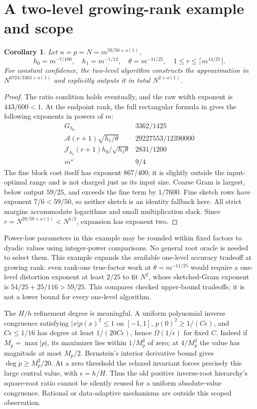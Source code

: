 \documentclass[11pt]{article}
\newtheorem{corollary}[theorem]{Corollary}
\newcommand{\Ac}{\mathcal A}
\newcommand{\Jc}{\mathcal J}
\begin{document}
\section{A two-level growing-rank example and scope}
\begin{corollary}\label{cor:twolevel}
Let \(n=p=N=m^{59/50+o(1)}\),
\[
 h_0=m^{-7/100},\quad h_1=m^{-1/12},\quad
 \theta=m^{-11/25},\quad1\leq r\leq\lceil m^{14/25}\rceil.
\]
For constant confidence, the two-level algorithm constructs the
approximation in \(N^{6724/3363+o(1)}\) and explicitly outputs it in
total \(N^{2+o(1)}\).
\end{corollary}
\begin{proof}
The ratio condition holds eventually, and the raw width exponent is
\(443/600<1\). At the endpoint rank, the full rectangular formula in
\cite{amanov} gives the following exponents in powers of \(m\):
\[
\begin{array}{c|c}
 G_{h_0}&3362/1425\\
 \Ac(r+1)\sqrt{h_1/\theta}&29227553/12390000\\
 \Jc_{h_1}(r+1)h_0/\sqrt{h_1\theta}&2831/1200\\
 m^\omega&9/4
\end{array}
\]
The fine block cost itself has exponent \(867/400\); it is slightly
outside the input-optimal range and is not charged just as its input
size. Coarse Gram is largest, below output \(59/25\), and exceeds
the fine term by \(1/7600\). Fine sketch rows have exponent
\(7/6<59/50\), so neither sketch is an identity fallback here.
All strict margins accommodate logarithms and small multiplication slack.
Since \(r=N^{28/59+o(1)}<N^{1/2}\), expansion has exponent two.
\end{proof}

Power-law parameters in this example may be rounded within fixed factors
to dyadic values using integer-power comparisons. No general root oracle
is needed to select them. This example expands the available one-level
accuracy tradeoff at growing rank: even rank-one true-factor work at
\(\theta=m^{-11/25}\) would require a one-level distortion exponent
at least \(2/25\) to fit \(N^2\), whose sketched-Gram exponent is
\(54/25+25/116>59/25\). This compares checked upper-bound tradeoffs;
it is not a lower bound for every one-level algorithm.

The \(H/h\) refinement degree is meaningful. A uniform polynomial
inverse congruence satisfying \(|x|p(x)^2\leq1\) on \([-1,1]\),
\(p(0)^2\geq1/(C\epsilon)\), and \(C\epsilon\leq1/16\) has degree
at least \(1/(20C\epsilon)\), hence \(\Omega(1/\epsilon)\) for fixed \(C\).
Indeed if \(M_p=\max|p|\), its maximizer lies within \(1/M_p^2\)
of zero; at \(4/M_p^2\) the value has magnitude at most \(M_p/2\).
Bernstein's interior derivative bound gives
\(\deg p\geq M_p^2/20\). At a zero threshold the relaxed invariant
forces precisely this large central value, with \(\epsilon=h/H\).
Thus the old positive inverse-root hierarchy's square-root ratio cannot
be silently reused for a uniform absolute-value congruence. Rational
or data-adaptive mechanisms are outside this scoped observation.
\end{document}
